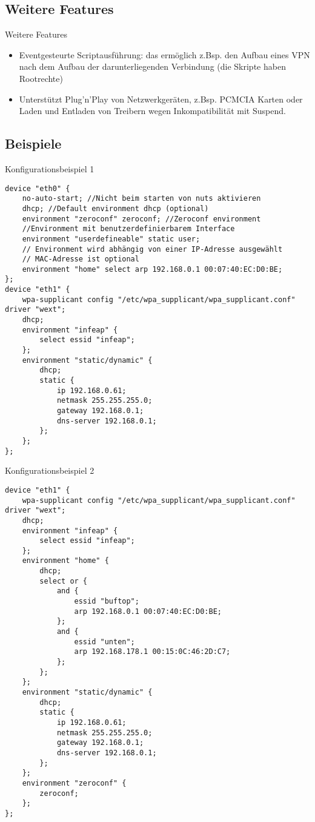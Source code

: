 \subsection{Weitere Features}
\begin{frame}[<+-|alert@+>]{Weitere Features}
	\begin{itemize}
		\item Eventgesteurte Scriptausführung: das ermöglich z.Bsp. den Aufbau eines VPN nach dem Aufbau der darunterliegenden Verbindung (die Skripte haben Rootrechte)
		\item Unterstützt Plug'n'Play von Netzwerkgeräten, z.Bsp. PCMCIA Karten oder Laden und Entladen von Treibern wegen Inkompatibilität mit Suspend.
	\end{itemize}
\end{frame}

\subsection{Beispiele}
\begin{frame}[fragile]{Konfigurationsbeispiel 1}
\tiny
\begin{verbatim}
device "eth0" {
    no-auto-start; //Nicht beim starten von nuts aktivieren
    dhcp; //Default environment dhcp (optional)
    environment "zeroconf" zeroconf; //Zeroconf environment
    //Environment mit benutzerdefinierbarem Interface
    environment "userdefineable" static user;
    // Environment wird abhängig von einer IP-Adresse ausgewählt
    // MAC-Adresse ist optional
    environment "home" select arp 192.168.0.1 00:07:40:EC:D0:BE;
};
device "eth1" {
    wpa-supplicant config "/etc/wpa_supplicant/wpa_supplicant.conf" driver "wext";
    dhcp;
    environment "infeap" {
        select essid "infeap";
    };
    environment "static/dynamic" {
        dhcp;
        static {
            ip 192.168.0.61;
            netmask 255.255.255.0;
            gateway 192.168.0.1;
            dns-server 192.168.0.1;
        };
    };
};
\end{verbatim}
\end{frame}

\begin{frame}[fragile]{Konfigurationsbeispiel 2}
\fontsize{4.8}{5.8} \selectfont
\begin{verbatim}
device "eth1" {
    wpa-supplicant config "/etc/wpa_supplicant/wpa_supplicant.conf" driver "wext";
    dhcp;
    environment "infeap" {
        select essid "infeap";
    };
    environment "home" {
        dhcp;
        select or {
            and {
                essid "buftop";
                arp 192.168.0.1 00:07:40:EC:D0:BE;
            };
            and {
                essid "unten";
                arp 192.168.178.1 00:15:0C:46:2D:C7;
            };
        };
    };
    environment "static/dynamic" {
        dhcp;
        static {
            ip 192.168.0.61;
            netmask 255.255.255.0;
            gateway 192.168.0.1;
            dns-server 192.168.0.1;
        };
    };
    environment "zeroconf" {
        zeroconf;
    };
};
\end{verbatim}
\end{frame}
